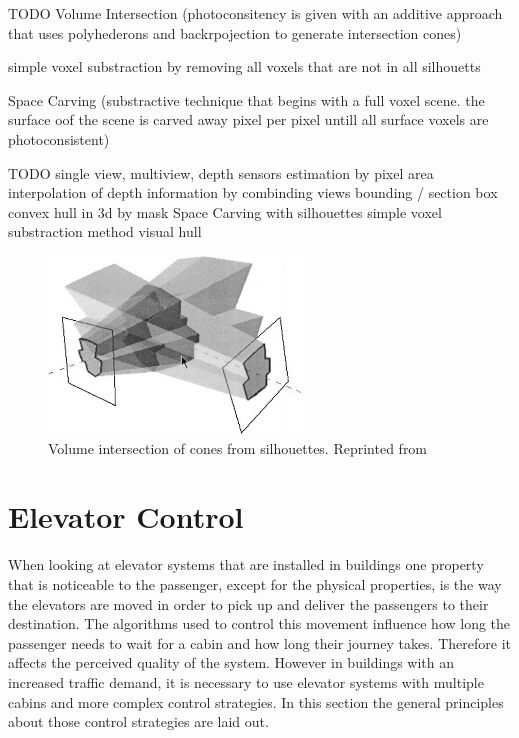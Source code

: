 TODO
Volume Intersection (photoconsitency is given with an additive approach that uses polyhederons and backrpojection to generate intersection cones)
\autocite[][]{}

simple voxel substraction by removing all voxels that are not in all silhouetts

Space Carving (substractive technique that begins with a full voxel scene. the surface oof the scene is carved away pixel per pixel untill all surface voxels  are photoconsistent)
\autocite[][]{kutulakos1999spacecarving}

TODO
single view, multiview, depth sensors
estimation by pixel area
interpolation of depth information by combinding views
bounding / section box
convex hull in 3d by mask
Space Carving with silhouettes
simple voxel substraction method
visual hull 



\begin{figure}[hbt]
	\centering
	\includegraphics[width=0.6\textwidth, keepaspectratio]{resources/volume_intersection_bottino}
	\caption{\label{fig:sota:volumeintersection} Volume intersection of cones from silhouettes.
	Reprinted from \textcite[][]{bottino2001silhouette}}
\end{figure}

\section{Elevator Control}

When looking at elevator systems that are installed in buildings
one property that is noticeable to the passenger, except for the physical properties, is the way the elevators are moved in order to pick up and deliver the passengers to their destination.
The algorithms used to control this movement influence how long the passenger needs to wait for a cabin and how long their journey takes.
Therefore it affects the perceived quality of the system.
However in buildings with an increased traffic demand, it is necessary to use elevator systems with multiple cabins and more complex control strategies.
In this section the general principles about those control strategies are laid out.

